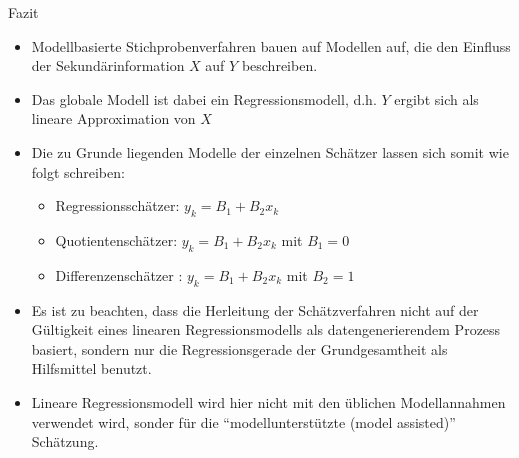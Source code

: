 \documentclass[9pt]{beamer}
\begin{document}
\begin{frame}{Fazit}
\begin{itemize}
	\item Modellbasierte Stichprobenverfahren bauen auf Modellen auf, die den Einfluss der Sekundärinformation $X$ auf $Y$ beschreiben. 
	\item Das globale Modell ist dabei ein Regressionsmodell, d.h. $Y$ ergibt sich als lineare Approximation von $X$
	\item Die zu Grunde liegenden Modelle der einzelnen Schätzer lassen sich somit wie folgt schreiben:
	\begin{itemize}
\item Regressionsschätzer: $y_k = B_1 + B_2 x_k$
\item Quotientenschätzer: $y_k = B_1 + B_2 x_k$ mit $B_1 = 0$
\item Differenzenschätzer : $y_k = B_1 + B_2 x_k$ mit $B_2 = 1$
\end{itemize}
\item Es ist zu beachten, dass die Herleitung der Schätzverfahren nicht auf der Gültigkeit eines linearen Regressionsmodells als datengenerierendem Prozess basiert, sondern nur die Regressionsgerade der Grundgesamtheit als Hilfsmittel benutzt.
\item Lineare Regressionsmodell wird hier nicht mit den üblichen Modellannahmen verwendet wird, sonder für die \enquote{modellunterstützte (model assisted)} Schätzung.
\end{itemize}
\end{frame}
\end{document}
